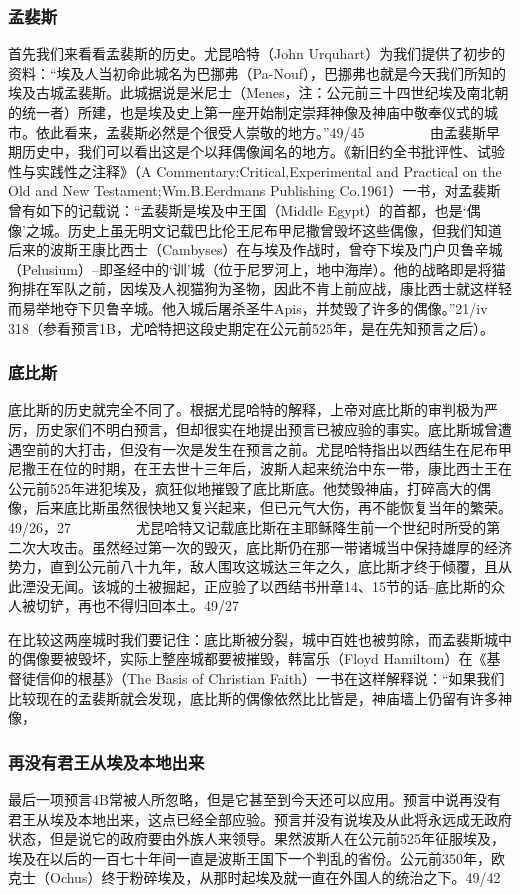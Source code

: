 \subsubsection{孟裴斯}
首先我们来看看孟裴斯的历史。尤昆哈特（John Urquhart）为我们提供了初步的资料：“埃及人当初命此城名为巴挪弗（Pa-Nouf），巴挪弗也就是今天我们所知的埃及古城孟裴斯。此城据说是米尼士（Menes，注：公元前三十四世纪埃及南北朝的统一者）所建，也是埃及史上第一座开始制定崇拜神像及神庙中敬奉仪式的城市。依此看来，孟裴斯必然是个很受人崇敬的地方。”49/45
　　
　　由孟裴斯早期历史中，我们可以看出这是个以拜偶像闻名的地方。《新旧约全书批评性、试验性与实践性之注释》（A Commentary:Critical,Experimental and Practical on the Old and New Testament;Wm.B.Eerdmans Publishing Co.1961）一书，对孟裴斯曾有如下的记载说：“孟裴斯是埃及中王国（Middle Egypt）的首都，也是‘偶像’之城。历史上虽无明文记载巴比伦王尼布甲尼撒曾毁坏这些偶像，但我们知道后来的波斯王康比西士（Cambyses）在与埃及作战时，曾夺下埃及门户贝鲁辛城（Pelusium）--即圣经中的‘训’城（位于尼罗河上，地中海岸）。他的战略即是将猫狗排在军队之前，因埃及人视猫狗为圣物，因此不肯上前应战，康比西士就这样轻而易举地夺下贝鲁辛城。他入城后屠杀圣牛Apis，并焚毁了许多的偶像。”21/iv 318（参看预言1B，尤哈特把这段史期定在公元前525年，是在先知预言之后）。
\subsubsection{底比斯}
底比斯的历史就完全不同了。根据尤昆哈特的解释，上帝对底比斯的审判极为严厉，历史家们不明白预言，但却很实在地提出预言已被应验的事实。底比斯城曾遭遇空前的大打击，但没有一次是发生在预言之前。尤昆哈特指出以西结生在尼布甲尼撒王在位的时期，在王去世十三年后，波斯人起来统治中东一带，康比西士王在公元前525年进犯埃及，疯狂似地摧毁了底比斯底。他焚毁神庙，打碎高大的偶像，后来底比斯虽然很快地又复兴起来，但已元气大伤，再不能恢复当年的繁荣。49/26，27
　　
　　尤昆哈特又记载底比斯在主耶稣降生前一个世纪时所受的第二次大攻击。虽然经过第一次的毁灭，底比斯仍在那一带诸城当中保持雄厚的经济势力，直到公元前八十九年，敌人围攻这城达三年之久，底比斯才终于倾覆，且从此湮没无闻。该城的土被掘起，正应验了以西结书卅章14、15节的话--底比斯的众人被切铲，再也不得归回本土。49/27

在比较这两座城时我们要记住：底比斯被分裂，城中百姓也被剪除，而孟裴斯城中的偶像要被毁坏，实际上整座城都要被摧毁，韩富乐（Floyd Hamiltom）在《基督徒信仰的根基》（The Basis of Christian Faith）一书在这样解释说：“如果我们比较现在的孟裴斯就会发现，底比斯的偶像依然比比皆是，神庙墙上仍留有许多神像，

\subsubsection{再没有君王从埃及本地出来}
最后一项预言4B常被人所忽略，但是它甚至到今天还可以应用。预言中说再没有君王从埃及本地出来，这点已经全部应验。预言并没有说埃及从此将永远成无政府状态，但是说它的政府要由外族人来领导。果然波斯人在公元前525年征服埃及，埃及在以后的一百七十年间一直是波斯王国下一个判乱的省份。公元前350年，欧克士（Ochus）终于粉碎埃及，从那时起埃及就一直在外国人的统治之下。49/42










